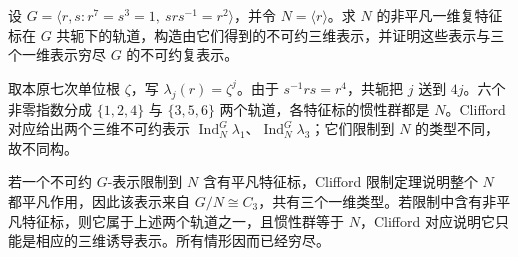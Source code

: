 \begin{exercise}\label{b5:ex:04-order-twenty-one}
	设 \(G=\langle r,s:r^7=s^3=1,\ srs^{-1}=r^2\rangle\)，并令 \(N=\langle r\rangle\)。求 \(N\) 的非平凡一维复特征标在 \(G\) 共轭下的轨道，构造由它们得到的不可约三维表示，并证明这些表示与三个一维表示穷尽 \(G\) 的不可约复表示。
\end{exercise}
\begin{solution}
	取本原七次单位根 \(\zeta\)，写 \(\lambda_j(r)=\zeta^j\)。由于 \(s^{-1}rs=r^4\)，共轭把 \(j\) 送到 \(4j\)。六个非零指数分成 \(\{1,2,4\}\) 与 \(\{3,5,6\}\) 两个轨道，各特征标的惯性群都是 \(N\)。Clifford 对应给出两个三维不可约表示 \(\operatorname{Ind}_N^G\lambda_1\)、\(\operatorname{Ind}_N^G\lambda_3\)；它们限制到 \(N\) 的类型不同，故不同构。

	若一个不可约 \(G\)-表示限制到 \(N\) 含有平凡特征标，Clifford 限制定理说明整个 \(N\) 都平凡作用，因此该表示来自 \(G/N\cong C_3\)，共有三个一维类型。若限制中含有非平凡特征标，则它属于上述两个轨道之一，且惯性群等于 \(N\)，Clifford 对应说明它只能是相应的三维诱导表示。所有情形因而已经穷尽。
\end{solution}
